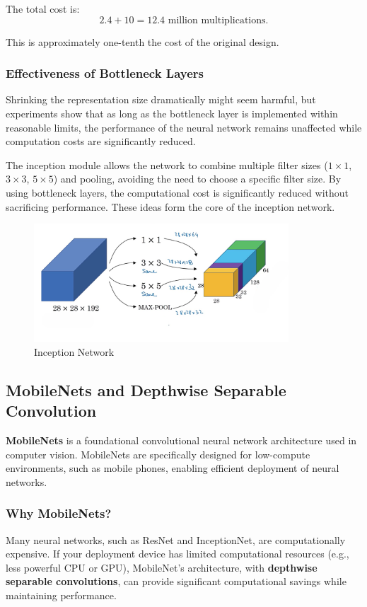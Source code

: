 \documentclass[letterpaper,12pt,notitlepage,twoside]{report}
\begin{document}
The total cost is:
\[
2.4 + 10 = 12.4 \text{ million multiplications}.
\]

This is approximately one-tenth the cost of the original design.

\subsubsection*{Effectiveness of Bottleneck Layers}
Shrinking the representation size dramatically might seem harmful, but experiments show that as long as the bottleneck layer is implemented within reasonable limits, the performance of the neural network remains unaffected while computation costs are significantly reduced.

The inception module allows the network to combine multiple filter sizes ($1 \times 1$, $3 \times 3$, $5 \times 5$) and pooling, avoiding the need to choose a specific filter size. By using bottleneck layers, the computational cost is significantly reduced without sacrificing performance. These ideas form the core of the inception network.

\begin{figure}[h]
	\centering
	\includegraphics[width=0.85\textwidth]{Images/Inception Network.png}
	\caption{Inception Network}
	\label{fig:38}
\end{figure}
\FloatBarrier

\subsection*{MobileNets and Depthwise Separable Convolution}
\textbf{MobileNets} is a foundational convolutional neural network architecture used in computer vision. MobileNets are specifically designed for low-compute environments, such as mobile phones, enabling efficient deployment of neural networks. 

\subsubsection*{Why MobileNets?}
Many neural networks, such as ResNet and InceptionNet, are computationally expensive. If your deployment device has limited computational resources (e.g., less powerful CPU or GPU), MobileNet's architecture, with \textbf{depthwise separable convolutions}, can provide significant computational savings while maintaining performance.
\end{document}
